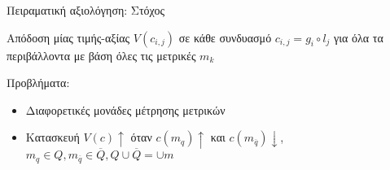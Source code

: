 \begin{frame}{Πειραματική αξιολόγηση: Στόχος}

  \begin{bw_box}
    Απόδοση μίας τιμής-αξίας $V(c_{i,j})$ σε κάθε συνδυασμό $c_{i,j} = g_i \circ l_j$ για όλα τα περιβάλλοντα με βάση όλες τις μετρικές $m_k$
  \end{bw_box}

  \vspace{1cm}

  Προβλήματα:
  \begin{itemize}
    \item Διαφορετικές μονάδες μέτρησης μετρικών
    \item Κατασκευή $V(c) \uparrow$ όταν $c(m_q) \uparrow$ και $c(m_{\overline{q}})\downarrow$, \hspace{0.5cm} $m_q \in Q, m_{\overline{q}} \in \overline{Q}, Q \cup \overline{Q} = \cup m$
  \end{itemize}

\end{frame}
